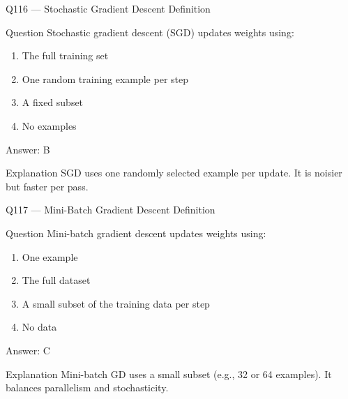 \documentclass[aspectratio=169,8pt]{beamer}
\begin{document}
	\begin{frame}{Q116 --- Stochastic Gradient Descent Definition}
		\begin{block}{Question}
			Stochastic gradient descent (SGD) updates weights using:
			\begin{enumerate}
				\item The full training set
				\item One random training example per step
				\item A fixed subset
				\item No examples
			\end{enumerate}
		\end{block}
		\begin{exampleblock}{Answer: B}\end{exampleblock}
		\begin{block}{Explanation}
			SGD uses one randomly selected example per update. It is noisier but faster per pass.
		\end{block}
	\end{frame}
	
	\begin{frame}{Q117 --- Mini-Batch Gradient Descent Definition}
		\begin{block}{Question}
			Mini-batch gradient descent updates weights using:
			\begin{enumerate}
				\item One example
				\item The full dataset
				\item A small subset of the training data per step
				\item No data
			\end{enumerate}
		\end{block}
		\begin{exampleblock}{Answer: C}\end{exampleblock}
		\begin{block}{Explanation}
			Mini-batch GD uses a small subset (e.g., 32 or 64 examples). It balances parallelism and stochasticity.
		\end{block}
	\end{frame}
	
\end{document}
